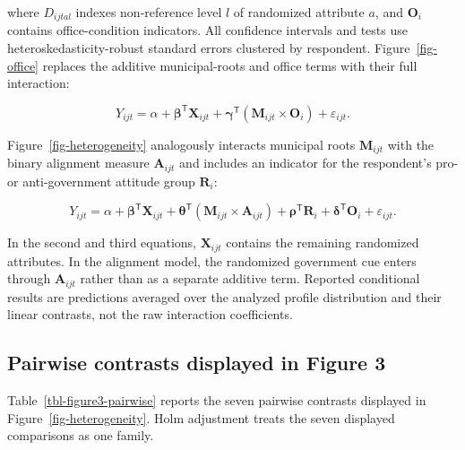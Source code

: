\documentclass[
  letterpaper,
  DIV=11,
  numbers=noendperiod]{scrartcl}
\newcommand{\criticmarkupadd}[1]{#1}
\newcommand{\criticmarkuprm}[1]{}
\begin{document}
where \(D_{ijtal}\) indexes non-reference level \(l\) of randomized
attribute \(a\), and \(\mathbf{O}_{i}\) contains office-condition
indicators. All confidence intervals and tests use
heteroskedasticity-robust standard errors clustered by respondent.
Figure~\ref{fig-office} replaces the additive municipal-roots and office
terms with their full interaction:

\[
Y_{ijt}=\alpha+\boldsymbol{\beta}^{\mathsf T}\mathbf{X}_{ijt}+\boldsymbol{\gamma}^{\mathsf T}(\mathbf{M}_{ijt}\times\mathbf{O}_{i})+\varepsilon_{ijt}.
\]

Figure~\ref{fig-heterogeneity} analogously interacts municipal roots
\(\mathbf{M}_{ijt}\) with the binary alignment measure
\(\mathbf{A}_{ijt}\) and
\criticmarkuprm{controls}\criticmarkupadd{includes an indicator} for the
respondent's pro- or anti-government attitude group \(\mathbf{R}_{i}\):

\[
Y_{ijt}=\alpha+\boldsymbol{\beta}^{\mathsf T}\mathbf{X}_{ijt}+\boldsymbol{\theta}^{\mathsf T}(\mathbf{M}_{ijt}\times\mathbf{A}_{ijt})+\boldsymbol{\rho}^{\mathsf T}\mathbf{R}_{i}+\boldsymbol{\delta}^{\mathsf T}\mathbf{O}_{i}+\varepsilon_{ijt}.
\]

In the second and third equations, \(\mathbf{X}_{ijt}\) contains the
remaining randomized attributes. In the alignment model, the randomized
government cue enters through \(\mathbf{A}_{ijt}\) rather than as a
separate additive term. Reported conditional results are predictions
averaged over the analyzed profile distribution and their linear
contrasts, not the raw interaction coefficients.

\subsection*{Pairwise contrasts displayed in Figure
3}\label{pairwise-contrasts-displayed-in-figure-3}

Table~\ref{tbl-figure3-pairwise} reports the seven pairwise contrasts
displayed in Figure~\ref{fig-heterogeneity}. Holm adjustment treats the
seven displayed comparisons as one family.
\end{document}
